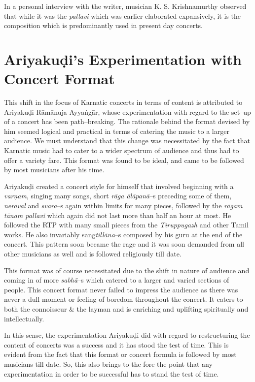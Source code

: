 In a personal interview with the writer, musician K. S. Krishnamurthy observed that while it was the \textit{pallavi} which was earlier elaborated expansively, it is the composition which is predominantly used in present day concerts.


\section*{Ariyakuḍi’s Experimentation with Concert Format}

This shift in the focus of Karnatic concerts in terms of content is attributed to Ariyakuḍi Rāmānuja Ayyaṅgār, whose experimentation with regard to the set–up of a concert has been path–breaking. The rationale behind the format devised by him seemed logical and practical in terms of catering the music to a larger audience. We must understand that this change was necessitated by the fact that Karnatic music had to cater to a wider spectrum of audience and thus had to offer a variety fare. This format was found to be ideal, and came to be followed by most musicians after his time.

Ariyakuḍi created a concert style for himself that involved beginning with a \textit{varṇam}, singing many songs, short \textit{rāga ālāpanā}–s preceding some of them, \textit{neraval} and \textit{svara}–s again within limits for many pieces, followed by the \textit{rāgam tānam pallavi} which again did not last more than half an hour at most. He followed the RTP with many small pieces from the \textit{Tiruppugazh} and other Tamil works. He also invariably sang\break \textit{tillāna}–s composed by his guru at the end of the concert. This pattern soon became the rage and it was soon demanded from all other musicians as well and is followed religiously till date.

This format was of course necessitated due to the shift in nature of audience and coming in of more \textit{sabhā}–s which catered to a larger and varied sections of people. This concert format never failed to impress the audience as there was never a dull moment or feeling of boredom throughout the concert. It caters to both the connoisseur \& the layman and is enriching and uplifting spiritually and intellectually. 

In this sense, the experimentation Ariyakuḍi did with regard to restructuring the content of concerts was a success and it has stood the test of time. This is evident from the fact that this format or concert formula is followed by most musicians till date. So, this also brings to the fore the point that any experimentation in order to be successful has to stand the test of time.

